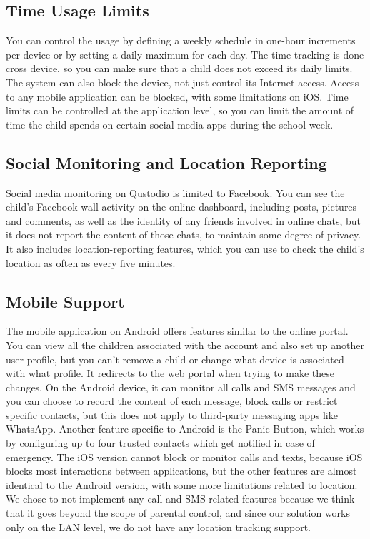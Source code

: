 \subsection{Time Usage Limits}

You can control the usage by defining a weekly schedule in one-hour increments per device or by setting a daily maximum for each day. The time tracking is done cross device, so you can make sure that a child does not exceed its daily limits. The system can also block the device, not just control its Internet access. Access to any mobile application can be blocked, with some limitations on iOS. Time limits can be controlled at the application level, so you can limit the amount of time the child spends on certain social media apps during the school week.

\subsection{Social Monitoring and Location Reporting}

Social media monitoring on Qustodio is limited to Facebook. You can see the child's Facebook wall activity on the online dashboard, including posts, pictures and comments, as well as the identity of any friends involved in online chats, but it does not report the content of those chats, to maintain some degree of privacy. It also includes location-reporting features, which you can use to check the child's location as often as every five minutes.

\subsection{Mobile Support}

The mobile application on Android offers features similar to the online portal. You can view all the children associated with the account and also set up another user profile, but you can't remove a child or change what device is associated with what profile. It redirects to the web portal when trying to make these changes. On the Android device, it can monitor all calls and SMS messages and you can choose to record the content of each message, block calls or restrict specific contacts, but this does not apply to third-party messaging apps like WhatsApp. Another feature specific to Android is the Panic Button, which works by configuring up to four trusted contacts which get notified in case of emergency. The iOS version cannot block or monitor calls and texts, because iOS blocks most interactions between applications, but the other features are almost identical to the Android version, with some more limitations related to location.\parencite{qustodioPCMag} We chose to not implement any call and SMS related features because we think that it goes beyond the scope of parental control, and since our solution works only on the LAN level, we do not have any location tracking support.

